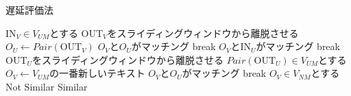\begin{algorithm}[H]
 \caption{遅延評価法}
 \label{alg:statedelay}
 \begin{algorithmic}[1]
  \State $\mbox{IN}_V\in V_{UM}$とする
  \State $\mbox{OUT}_V$をスライディングウィンドウから離脱させる
    \State $O_U\leftarrow Pair(\mbox{OUT}_V)$
      \State $O_V$と$O_U$がマッチング
      \State break
    \EndIf
    \EndFor
  \EndIf
  \State $O_V$と$\mbox{IN}_U$がマッチング
  \State break
  \EndIf
  \EndFor
  \State $\mbox{OUT}_U$をスライディングウィンドウから離脱させる
    \State $Pair(\mbox{OUT}_U)\in V_{UM}$とする
  \EndIf
    \State $O_V \leftarrow V_{UM} $の一番新しいテキスト
        \State $O_V$と$O_U$がマッチング
        \State break
      \EndIf
    \EndFor
      \State $O_V\in V_{NM}$とする
    \EndIf
  \EndWhile
  \State Not Similar
  \EndIf
  \State Similar
  \EndIf
 \end{algorithmic}
 \end{algorithm}